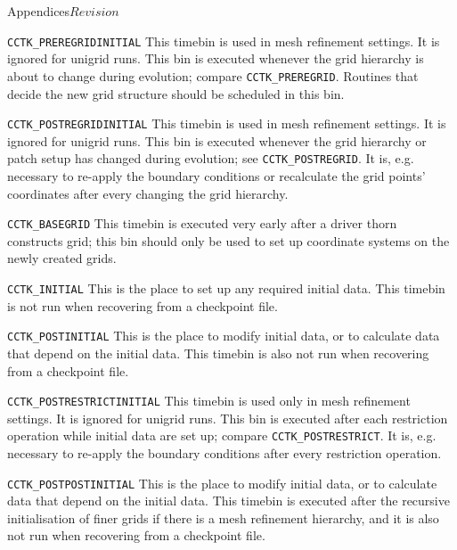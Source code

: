 \begin{cactuspart}{Appendices}{}{$Revision$}
\begin{Lentry}
\item[{\tt CCTK\_PREREGRIDINITIAL}]
        This timebin is used in mesh refinement settings.  It is
        ignored for unigrid runs.  This bin is executed whenever the
        grid hierarchy is about to change during evolution; compare
        {\tt CCTK\_PREREGRID}.  Routines that decide the
        new grid structure should be scheduled in this bin.

\item[{\tt CCTK\_POSTREGRIDINITIAL}]
        This timebin is used in mesh refinement settings.  It is
        ignored for unigrid runs.  This bin is executed whenever the
        grid hierarchy or patch setup has changed during evolution;
        see {\tt CCTK\_POSTREGRID}.  It is, e.g.
        necessary to re-apply the boundary conditions or recalculate
        the grid points' coordinates after every changing the grid
        hierarchy.

\item[{\tt CCTK\_BASEGRID}]
        This timebin is executed very early after a driver thorn
        constructs grid; this bin should only be used to set up
        coordinate systems on the newly created grids.

\item[{\tt CCTK\_INITIAL}] 
        This is the place to set up any required initial data. This timebin
        is not run when recovering from a checkpoint file.

\item[{\tt CCTK\_POSTINITIAL}]
        This is the place to modify initial data, or to calculate data
        that depend on the initial data.  This timebin is also not run
        when recovering from a checkpoint file.
        
\item[{\tt CCTK\_POSTRESTRICTINITIAL}]
        This timebin is used only in mesh refinement settings.  It is
        ignored for unigrid runs.  This bin is executed after each
        restriction operation while initial data are set up; compare
        {\tt CCTK\_POSTRESTRICT}.  It is,
        e.g. necessary to re-apply the
        boundary conditions after every restriction operation.

\item[{\tt CCTK\_POSTPOSTINITIAL}]
        This is the place to modify initial data, or to calculate data
        that depend on the initial data.  This timebin is executed
        after the recursive initialisation of finer grids if there is
        a mesh refinement hierarchy, and it is also not run
        when recovering from a checkpoint file.


\end{Lentry}
\end{cactuspart}

